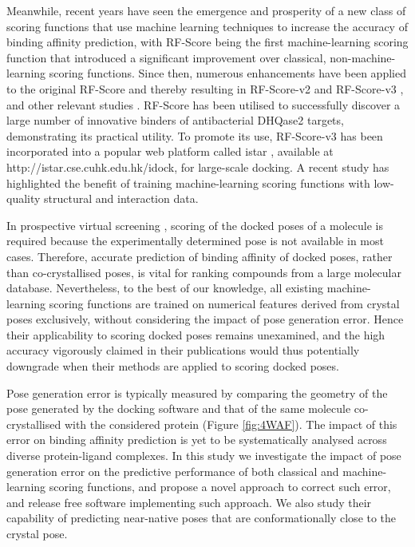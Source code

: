 \documentclass[twocolumn]{bmcart}
\begin{document}
Meanwhile, recent years have seen the emergence and prosperity of a new class of scoring functions that use machine learning techniques to increase the accuracy of binding affinity prediction, with RF-Score \cite{564} being the first machine-learning scoring function that introduced a significant improvement over classical, non-machine-learning scoring functions. Since then, numerous enhancements have been applied to the original RF-Score \cite{564} and thereby resulting in RF-Score-v2 \cite{1370} and RF-Score-v3 \cite{1647}, and other relevant studies \cite{1432}. RF-Score has been utilised \cite{1281} to successfully discover a large number of innovative binders of antibacterial DHQase2 targets, demonstrating its practical utility. To promote its use, RF-Score-v3 has been incorporated into a popular web platform called istar \cite{1362}, available at http://istar.cse.cuhk.edu.hk/idock, for large-scale docking. A recent study \cite{1663} has highlighted the benefit of training machine-learning scoring functions with low-quality structural and interaction data.

In prospective virtual screening \cite{1362}, scoring of the docked poses of a molecule is required because the experimentally determined pose is not available in most cases. Therefore, accurate prediction of binding affinity of docked poses, rather than co-crystallised poses, is vital for ranking compounds from a large molecular database. Nevertheless, to the best of our knowledge, all existing machine-learning scoring functions are trained on numerical features derived from crystal poses exclusively, without considering the impact of pose generation error. Hence their applicability to scoring docked poses remains unexamined, and the high accuracy vigorously claimed in their publications would thus potentially downgrade when their methods are applied to scoring docked poses.

Pose generation error is typically measured by comparing the geometry of the pose generated by the docking software and that of the same molecule co-crystallised with the considered protein (Figure \ref{fig:4WAF}). The impact of this error on binding affinity prediction is yet to be systematically analysed across diverse protein-ligand complexes. In this study we investigate the impact of pose generation error on the predictive performance of both classical and machine-learning scoring functions, and propose a novel approach to correct such error, and release free software implementing such approach. We also study their capability of predicting near-native poses that are conformationally close to the crystal pose.
\end{document}
